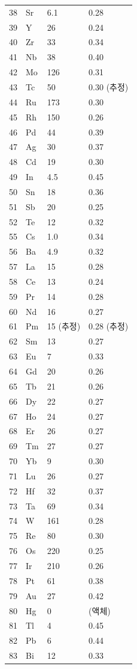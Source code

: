 \documentclass[12pt,a4paper]{article}
\begin{document}
\begin{longtable}{p{0.6cm}p{1.2cm}p{1.5cm}p{1.5cm}}
		38 & Sr & 6.1 & 0.28 \\
		39 & Y  & 26 & 0.24 \\
		40 & Zr & 33 & 0.34 \\
		41 & Nb & 38 & 0.40 \\
		42 & Mo & 126 & 0.31 \\
		43 & Tc & 50 & 0.30 (추정) \\
		44 & Ru & 173 & 0.30 \\
		45 & Rh & 150 & 0.26 \\
		46 & Pd & 44 & 0.39 \\
		47 & Ag & 30 & 0.37 \\
		48 & Cd & 19 & 0.30 \\
		49 & In & 4.5 & 0.45 \\
		50 & Sn & 18 & 0.36 \\
		51 & Sb & 20 & 0.25 \\
		52 & Te & 12 & 0.32 \\
		55 & Cs & 1.0 & 0.34 \\
		56 & Ba & 4.9 & 0.32 \\
		57 & La & 15 & 0.28 \\
		58 & Ce & 13 & 0.24 \\
		59 & Pr & 14 & 0.28 \\
		60 & Nd & 16 & 0.27 \\
		61 & Pm & 15 (추정) & 0.28 (추정) \\
		62 & Sm & 13 & 0.27 \\
		63 & Eu & 7 & 0.33 \\
		64 & Gd & 20 & 0.26 \\
		65 & Tb & 21 & 0.26 \\
		66 & Dy & 22 & 0.27 \\
		67 & Ho & 24 & 0.27 \\
		68 & Er & 26 & 0.27 \\
		69 & Tm & 27 & 0.27 \\
		70 & Yb & 9 & 0.30 \\
		71 & Lu & 26 & 0.27 \\
		72 & Hf & 32 & 0.37 \\
		73 & Ta & 69 & 0.34 \\
		74 & W  & 161 & 0.28 \\
		75 & Re & 80 & 0.30 \\
		76 & Os & 220 & 0.25 \\
		77 & Ir & 210 & 0.26 \\
		78 & Pt & 61 & 0.38 \\
		79 & Au & 27 & 0.42 \\
		80 & Hg & 0 & (액체) \\
		81 & Tl & 4 & 0.45 \\
		82 & Pb & 6 & 0.44 \\
		83 & Bi & 12 & 0.33 \\
		\bottomrule
	\end{longtable}
	
\end{document}
